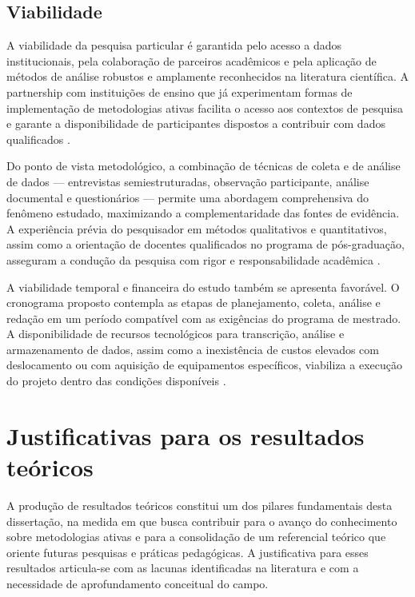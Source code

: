 \subsection{Viabilidade}
\label{subsec:jp_viabilidade}

A viabilidade da pesquisa particular é garantida pelo acesso a dados institucionais, pela colaboração de parceiros acadêmicos e pela aplicação de métodos de análise robustos e amplamente reconhecidos na literatura científica. A partnership com instituições de ensino que já experimentam formas de implementação de metodologias ativas facilita o acesso aos contextos de pesquisa e garante a disponibilidade de participantes dispostos a contribuir com dados qualificados \cite{MACIEL2018}.

Do ponto de vista metodológico, a combinação de técnicas de coleta e de análise de dados — entrevistas semiestruturadas, observação participante, análise documental e questionários — permite uma abordagem comprehensiva do fenômeno estudado, maximizando a complementaridade das fontes de evidência. A experiência prévia do pesquisador em métodos qualitativos e quantitativos, assim como a orientação de docentes qualificados no programa de pós-graduação, asseguram a condução da pesquisa com rigor e responsabilidade acadêmica \cite{BARDIN2016}.

A viabilidade temporal e financeira do estudo também se apresenta favorável. O cronograma proposto contempla as etapas de planejamento, coleta, análise e redação em um período compatível com as exigências do programa de mestrado. A disponibilidade de recursos tecnológicos para transcrição, análise e armazenamento de dados, assim como a inexistência de custos elevados com deslocamento ou com aquisição de equipamentos específicos, viabiliza a execução do projeto dentro das condições disponíveis \cite{CRESWELL2018}.

\section{Justificativas para os resultados teóricos}
\label{sec:justificativa_teoricos}

A produção de resultados teóricos constitui um dos pilares fundamentais desta dissertação, na medida em que busca contribuir para o avanço do conhecimento sobre metodologias ativas e para a consolidação de um referencial teórico que oriente futuras pesquisas e práticas pedagógicas. A justificativa para esses resultados articula-se com as lacunas identificadas na literatura e com a necessidade de aprofundamento conceitual do campo.

